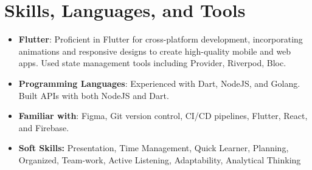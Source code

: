 \documentclass[11pt,a4paper,sans]{moderncv}
\begin{document}
\clearpage

\section{Skills, Languages, and Tools}
 {\begin{itemize}[label=\textbullet]
      \item {\textbf{Flutter}}: Proficient in Flutter for cross-platform development, incorporating animations and responsive designs to create high-quality mobile and web apps. Used state management tools including Provider, Riverpod, Bloc.
      \item {\textbf{Programming Languages}}: Experienced with Dart, NodeJS, and Golang. Built APIs with both NodeJS and Dart.
      \item {\textbf{Familiar with}}: Figma, Git version control, CI/CD pipelines, Flutter, React, and Firebase.
      \item {\textbf{Soft Skills:} Presentation, Time Management, Quick Learner, Planning, Organized, Team-work, Active Listening, Adaptability, Analytical Thinking}
  \end{itemize}}
\end{document}
